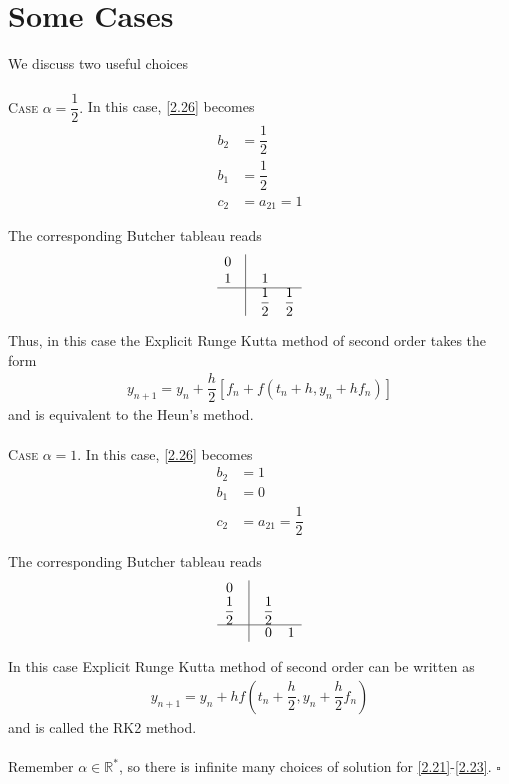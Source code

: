 \documentclass[a4paper,oneside]{book}
\numberwithin{equation}{chapter}
\begin{document}
\section{Some Cases}
We discuss two useful choices\\
\\
\textsc{Case $\alpha=\dfrac{1}{2}$.} In this case, \eqref{2.26} becomes
\begin{align}
{b_2} &= \dfrac{1}{2}\\
{b_1} &= \dfrac{1}{2}\\
{c_2} &= {a_{21}} = 1
\end{align}

The corresponding Butcher tableau reads
\begin{align}
\begin{array}{*{20}{c}}
0&\vline& {}&{}\\
1&\vline& 1&{}\\
\hline
{}&\vline& {\dfrac{1}{2}}&{\dfrac{1}{2}}
\end{array}
\end{align}

Thus, in this case the Explicit Runge Kutta method of second order takes the form
\begin{align}
{{y_{n + 1}}} = {{y_n}} + \dfrac{h}{2}\left[ {{f_n} + f\left( {{t_n} + h,{y_n} + h{f_n}} \right)} \right]
\end{align}
and is equivalent to the Heun's method.\\
\\
\textsc{Case $\alpha =1$.} In this case, \eqref{2.26} becomes
\begin{align}
{b_2} &= 1\\
{b_1} &= 0\\
{c_2} &= {a_{21}} = \dfrac{1}{2}
\end{align}

The corresponding Butcher tableau reads
\begin{align}
\begin{array}{*{20}{c}}
0&\vline& {}&{}\\
{\dfrac{1}{2}}&\vline& {\dfrac{1}{2}}&{}\\
\hline
{}&\vline& 0&1
\end{array}
\end{align}

In this case Explicit Runge Kutta method of second order can be written as
\begin{align}
{{y_{n + 1}}} = {{y_n}} + hf\left( {{t_n} + \dfrac{h}{2},{y_n} + \dfrac{h}{2}{f_n}} \right)
\end{align}
and is called the RK2 method.\\
\\
Remember $\alpha \in \mathbb{R}^*$, so there is infinite many choices of solution for \eqref{2.21}-\eqref{2.23}.  \hfill $\square$
\end{document}

